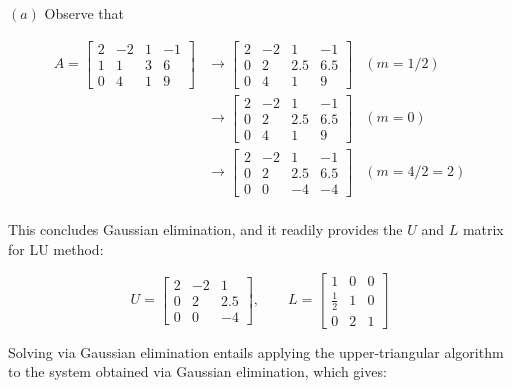\documentclass[12pt]{article}
\theoremstyle{definition}
\begin{document}
$(a)$ Observe that 

\begin{align*}
        A = \begin{bmatrix} 
            2 & -2 & 1 & -1 \\ 
            1 & 1 & 3 & 6 \\ 
            0  & 4 & 1 & 9
        \end{bmatrix} 
        &\to \begin{bmatrix} 
            2 & -2 & 1 & -1 \\ 
            0 & 2 & 2.5 & 6.5 \\ 
            0  & 4 & 1 & 9
        \end{bmatrix} & (m = 1 / 2) \\ 
        &\to \begin{bmatrix} 
            2 & -2 & 1 & -1 \\ 
            0 & 2 & 2.5 & 6.5 \\ 
            0  & 4 & 1 & 9
        \end{bmatrix} & (m = 0)\\ 
        &\to \begin{bmatrix} 
            2 & -2 & 1 & -1 \\ 
            0 & 2 & 2.5 & 6.5 \\ 
            0  & 0 & -4 & -4
        \end{bmatrix} & (m = 4 / 2 = 2)\\ 
\end{align*}

This concludes Gaussian elimination, and it readily provides the $U$ and $L$
matrix for LU method:

\begin{equation*}
        U = \begin{bmatrix} 
            2 & -2 & 1  \\ 
            0 & 2 & 2.5  \\ 
            0  & 0 & -4 
        \end{bmatrix}, \qquad L = \begin{bmatrix} 
            1 & 0 & 0 \\ 
            \frac{1}{2} & 1 & 0 \\ 
            0 & 2 & 1
        \end{bmatrix} 
\end{equation*}

Solving via Gaussian elimination entails applying the upper-triangular
algorithm to the system obtained via Gaussian elimination, which gives: 
\end{document}
